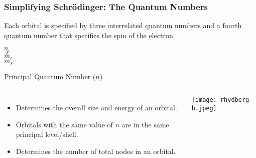 \documentclass[handout,notes=hide]{beamer}
\begin{document}
\begin{frame}[s]
	\frametitle{Simplifying Schrödinger: The Quantum Numbers}
	Each orbital is specified by three interrelated quantum numbers and a
	fourth quantum number that specifies the spin of the electron.
	\begin{description}
	\item[$n$] \vfill
	\item[$\ell$] \vfill
	\item[$m_\ell$] \vfill
	\item[$m_s$] \vfill
	\end{description}
\end{frame}

\begin{frame}{Principal Quantum Number ($n$)}
	\begin{columns}
	\begin{itemize}
		\item Determines the overall \alert{size} and \alert{energy} of an orbital.
		\item Orbitals with the same value of $n$ are in the \alert{same}
			principal level/shell.
		\item Determines the number of \alert{total nodes} in an
			orbital.
	\end{itemize}


	\texttt{[image: rhydberg-h.jpeg]}
\end{columns}

\end{frame}
\end{document}
